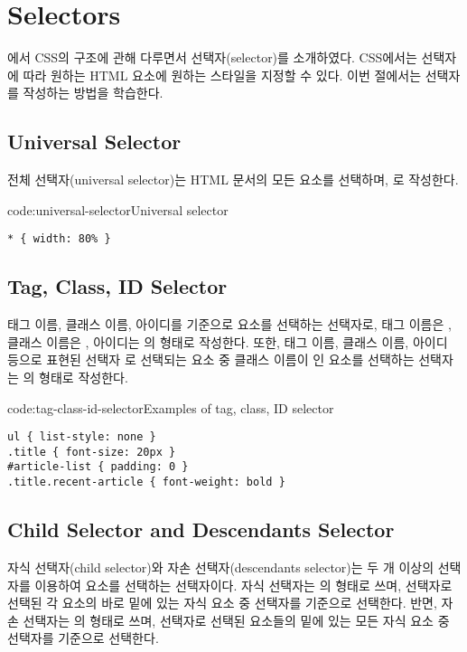 \section{Selectors}\label{sect:selectors}

에서 CSS의 구조에 관해 다루면서 선택자(selector)를 소개하였다. CSS에서는 선택자에 따라 원하는 HTML 요소에 원하는 스타일을 지정할 수 있다. 이번 절에서는 선택자를 작성하는 방법을 학습한다.

\subsection*{Universal Selector}

전체 선택자(universal selector)는 HTML 문서의 모든 요소를 선택하며, \cd{*}로 작성한다.

\begin{codeenv}{code:universal-selector}{Universal selector}\begin{verbatim}
* { width: 80% }
\end{verbatim}
\end{codeenv}

\subsection*{Tag, Class, ID Selector}
태그 이름, 클래스 이름, 아이디를 기준으로 요소를 선택하는 선택자로, 태그 이름은 , 클래스 이름은 , 아이디는 의 형태로 작성한다. 또한, 태그 이름, 클래스 이름, 아이디 등으로 표현된 선택자 로 선택되는 요소 중 클래스 이름이 인 요소를 선택하는 선택자는 의 형태로 작성한다.

\begin{codeenv}{code:tag-class-id-selector}{Examples of tag, class, ID selector}\begin{verbatim}
ul { list-style: none }
.title { font-size: 20px }
#article-list { padding: 0 }
.title.recent-article { font-weight: bold }
\end{verbatim}
\end{codeenv}

\subsection*{Child Selector and Descendants Selector}

자식 선택자(child selector)와 자손 선택자(descendants selector)는 두 개 이상의 선택자를 이용하여 요소를 선택하는 선택자이다. 자식 선택자는 의 형태로 쓰며,  선택자로 선택된 각 요소의 바로 밑에 있는 자식 요소 중  선택자를 기준으로 선택한다. 반면, 자손 선택자는 의 형태로 쓰며,  선택자로 선택된 요소들의 밑에 있는 모든 자식 요소 중  선택자를 기준으로 선택한다.

